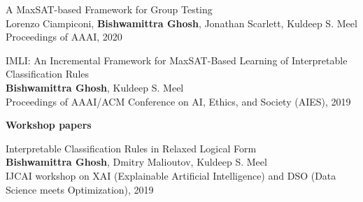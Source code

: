 \documentclass[a4paper,11pt,final]{article}
\newcommand{\SmallSep}{\vspace{0.5em}}
\begin{document}
	\begin{enumerate}[{[C}1{]}]
		\item 	{A MaxSAT-based Framework for Group Testing} \\
		Lorenzo Ciampiconi, \textbf{Bishwamittra Ghosh}, Jonathan Scarlett, Kuldeep S. Meel\\
		Proceedings of AAAI, 2020
		\item {IMLI: An Incremental Framework for MaxSAT-Based Learning of Interpretable \\ Classification Rules}\\
		\textbf{Bishwamittra Ghosh}, Kuldeep S. Meel\\
		Proceedings of AAAI/ACM Conference on AI, Ethics, and Society (AIES), 2019
	\end{enumerate}


\SmallSep
\textbf{Workshop papers}\\

	\begin{enumerate}[{[W}1{]}]
		\item 	{Interpretable Classification Rules in Relaxed Logical Form}\\
		\textbf{Bishwamittra Ghosh}, Dmitry Malioutov, Kuldeep S. Meel\\
		IJCAI workshop on XAI (Explainable Artificial Intelligence) and DSO (Data Science meets Optimization), 2019
	\end{enumerate}
	
\end{document}
